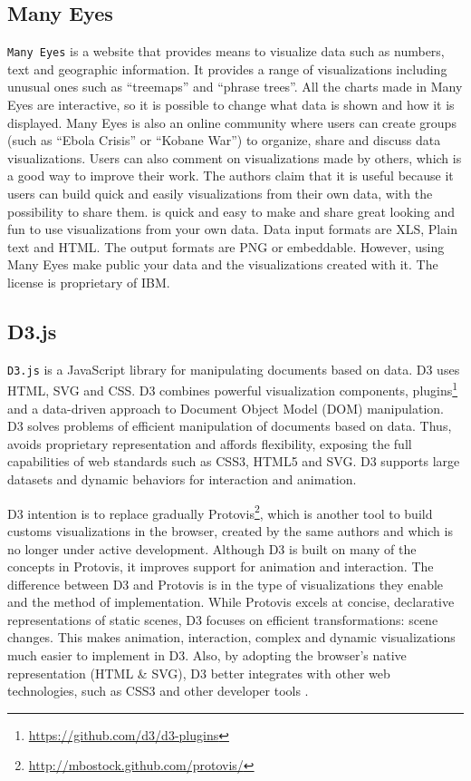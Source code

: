 \subsection{Many Eyes}
\label{sec:manyEyes}
\texttt{Many Eyes} \cite{ibm2010} is a website that provides means to visualize data such as numbers, text and geographic information. It provides a range of visualizations including unusual ones such as ``treemaps''  and ``phrase trees''. All the charts made in Many Eyes are interactive, so it is possible to change what data is shown and how it is displayed. Many Eyes is also an online community where users can create groups (such as ``Ebola Crisis'' or ``Kobane War'') to organize, share and discuss data visualizations. Users can also comment on visualizations made by others, which is a good way to improve their work. The authors claim that it is useful because it users can build quick and easily visualizations from their own data, with the possibility to share them. is quick and easy to make and share great looking and fun to use visualizations from your own data. Data input formats are XLS, Plain text and HTML. The output formats are PNG or embeddable. However, using Many Eyes make public your data and the visualizations created with it. The license is proprietary of IBM. 

\subsection{D3.js}
\label{sec:d3js}

\texttt{D3.js} \cite{d3js} is a JavaScript library for manipulating documents based on data. D3 uses HTML, SVG and CSS. D3 combines powerful visualization components, plugins\footnote{\url{https://github.com/d3/d3-plugins}}  and a data-driven approach to Document Object Model (DOM) manipulation. D3 solves problems of efficient manipulation of documents based on data. Thus, avoids proprietary representation and affords flexibility, exposing the full capabilities of web standards such as CSS3, HTML5 and SVG. D3 supports large datasets and dynamic behaviors for interaction and animation.
  
D3 intention is to replace gradually Protovis\footnote{\url{http://mbostock.github.com/protovis/}}, which is another tool to build customs visualizations in the browser, created by the same authors and which is no longer under active development. Although D3 is built on many of the concepts in Protovis, it improves support for animation and interaction. The difference between D3 and Protovis  is in the type of visualizations they enable and the method of implementation. While Protovis excels at concise, declarative representations of static scenes, D3 focuses on efficient transformations: scene changes. This makes animation, interaction, complex and dynamic visualizations much easier to implement in D3. Also, by adopting the browser's native representation (HTML \& SVG), D3 better integrates with other web technologies, such as CSS3 and other developer tools .

